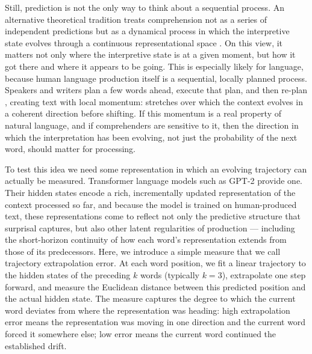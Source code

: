 \documentclass[12pt]{article}
\begin{document}
Still, prediction is not the only way to think about a sequential process. An alternative theoretical tradition treats comprehension not as a series of independent predictions but as a dynamical process in which the interpretive state evolves through a continuous representational space \citep{tabor1999,spivey2007,cho2017}. On this view, it matters not only where the interpretive state is at a given moment, but how it got there and where it appears to be going. This is especially likely for language, because human language production itself is a sequential, locally planned process. Speakers and writers plan a few words ahead, execute that plan, and then re-plan \citep{levelt1989,ferreira2002}, creating text with local momentum: stretches over which the context evolves in a coherent direction before shifting. If this momentum is a real property of natural language, and if comprehenders are sensitive to it, then the direction in which the interpretation has been evolving, not just the probability of the next word, should matter for processing.

To test this idea we need some representation in which an evolving trajectory can actually be measured. Transformer language models such as GPT-2 \citep{radford2019} provide one. Their hidden states encode a rich, incrementally updated representation of the context processed so far, and because the model is trained on human-produced text, these representations come to reflect not only the predictive structure that surprisal captures, but also other latent regularities of production --- including the short-horizon continuity of how each word's representation extends from those of its predecessors. Here, we introduce a simple measure that we call trajectory extrapolation error. At each word position, we fit a linear trajectory to the hidden states of the preceding $k$ words (typically $k = 3$), extrapolate one step forward, and measure the Euclidean distance between this predicted position and the actual hidden state. The measure captures the degree to which the current word deviates from where the representation was heading: high extrapolation error means the representation was moving in one direction and the current word forced it somewhere else; low error means the current word continued the established drift.
\end{document}
